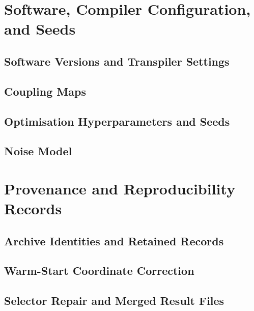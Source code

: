 \documentclass[journal,onecolumn,11pt]{IEEEtran}
\theoremstyle{plain}
\begin{document}
\section{Software, Compiler Configuration, and Seeds}
\label{sup:software}

\subsection{Software Versions and Transpiler Settings}
\label{sup:software:versions}

\subsection{Coupling Maps}
\label{sup:software:coupling}

\subsection{Optimisation Hyperparameters and Seeds}
\label{sup:software:hyperparameters}

\subsection{Noise Model}
\label{sup:software:noise}

\section{Provenance and Reproducibility Records}
\label{sup:provenance}

\subsection{Archive Identities and Retained Records}
\label{sup:provenance:archives}

\subsection{Warm-Start Coordinate Correction}
\label{sup:provenance:correction}

\subsection{Selector Repair and Merged Result Files}
\label{sup:provenance:selector}
\end{document}
